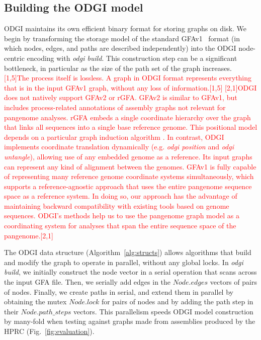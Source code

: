 \documentclass{bioinfo}
\newcommand{\REVIEWED}[1]{{\textcolor{Red}{#1}}}
\begin{document}



\subsection{Building the \textsc{ODGI} model}
\label{sec:build}
ODGI maintains its own efficient binary format for storing graphs on disk.
We begin by transforming the storage model of the standard GFAv1~\citep{GFA} format (in which nodes, edges, and paths are described independently) into the ODGI node-centric encoding with \textit{odgi build}.
This construction step can be a significant bottleneck, in particular as the size of the path set of the graph increases. \REVIEWED{[1,5]The process itself is lossless. A graph in ODGI format represents everything that is in the input GFAv1 graph, without any loss of information.[1,5]} \REVIEWED{[2,1]ODGI does not natively support GFAv2 or rGFA.
GFAv2 is similar to GFAv1, but includes process-related annotations of assembly graphs not relevant for pangenome analyses.
rGFA embeds a single coordinate hierarchy over the graph that links all sequences into a single base reference genome.
This positional model depends on a particular graph induction algorithm \cite{Li:2020}.
In contrast, ODGI implements coordinate translation dynamically (e.g. \textit{odgi position} and \textit{odgi untangle}), allowing use of any embedded genome as a reference.
Its input graphs can represent any kind of alignment between the genomes.
GFAv1 is fully capable of representing many reference genome coordinate systems simultaneously, which supports a reference-agnostic approach that uses the entire pangenome sequence space as a reference system.
In doing so, our approach has the advantage of maintaining backward compatibility with existing tools based on genome sequences.
ODGI's methods help us to use the pangenome graph model as a coordinating system for analyses that span the entire sequence space of the pangenome.[2,1]}

The ODGI data structure (Algorithm~\ref{alg:structs}) allows algorithms that build and modify the graph to operate in parallel, without any global locks.
In \textit{odgi build}, we initially construct the node vector in a serial operation that scans across the input GFA file.
Then, we serially add edges in the $Node.edges$ vectors of pairs of nodes.
Finally, we create paths in serial, and extend them in parallel by obtaining the mutex $Node.lock$ for pairs of nodes and by adding the path step in their $Node.path\_steps$ vectors.
This parallelism speeds ODGI model construction by many-fold when testing against graphs made from assemblies produced by the HPRC (Fig.~\ref{fig:evaluation}).
\end{document}
